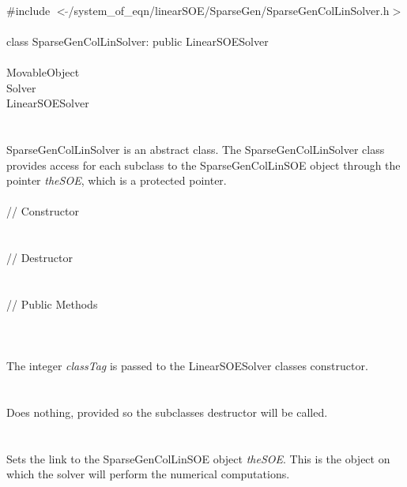 
   \\
\indent \#include $<\tilde{ }$/system\_of\_eqn/linearSOE/SparseGen/SparseGenColLinSolver.h$>$  \\

  \\
\indent class SparseGenColLinSolver: public LinearSOESolver  \\

 \\
\indent MovableObject \\
\indent\indent  Solver \\
\indent\indent\indent LinearSOESolver \\
\indent\indent\indent{} \\

  \\
\indent SparseGenColLinSolver is an abstract class.  The SparseGenColLinSolver
class provides access for each subclass to the SparseGenColLinSOE object
through the pointer {\em theSOE}, which is a protected pointer. \\

  \\
\indent\indent // Constructor \\
\indent{}  \\ \\
\indent\indent // Destructor \\
\indent{}\\  \\
\indent\indent // Public Methods \\
\indent{} \\

  \\
  \\
The integer {\em classTag} is passed to the LinearSOESolver classes
constructor. \\ 

 \\
\\ 
Does nothing, provided so the subclasses destructor will be called. \\

  \\
 \\
Sets the link to the SparseGenColLinSOE object {\em theSOE}. This is the
object on which the solver will perform the numerical computations. \\




